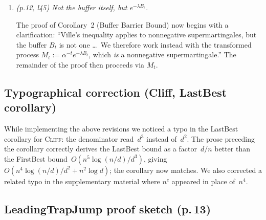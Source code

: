\documentclass[11pt]{article}
\newcommand{\RC}[1]{\textcolor{revcolor}{\textit{#1}}}
\newcommand{\resp}[1]{\smallskip\noindent #1\medskip}
\begin{document}
\begin{enumerate}[label=\textbf{C\arabic*.},leftmargin=*]
\item \RC{(p.12, l45) Not the buffer itself, but $e^{-\lambda B_t}$.}

\resp{The proof of Corollary~2 (Buffer Barrier Bound) now begins with a
clarification: ``Ville's inequality applies to nonnegative supermartingales,
but the buffer $B_t$ is not one \ldots\ We therefore work instead with the
transformed process $M_t := \alpha^{-t}e^{-\lambda B_t}$, which \emph{is} a
nonnegative supermartingale.'' The remainder of the proof then proceeds via
$M_t$.}

\end{enumerate}

\subsection*{Typographical correction (Cliff, LastBest corollary)}

\resp{While implementing the above revisions we noticed a typo in the
LastBest corollary for \textsc{Cliff}: the denominator read~$d^3$ instead
of~$d^2$.  The prose preceding the corollary correctly derives the
LastBest bound as a factor~$d/n$ better than the FirstBest
bound~$O(n^5 \log(n/d)/d^3)$, giving
$O(n^4 \log(n/d)/d^2 + n^2 \log d)$; the corollary now matches.
We also corrected a related typo in the supplementary material where $n^e$
appeared in place of~$n^4$.}



\subsection*{LeadingTrapJump proof sketch (p.\,13)}
\end{document}
